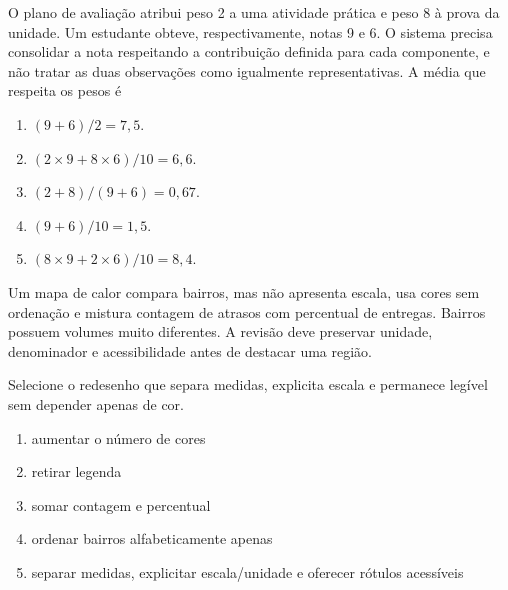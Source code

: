\documentclass[12pt,a4paper]{article}
\begin{document}
\TextoBase O plano de avaliação atribui peso 2 a uma atividade prática e peso 8 à prova da unidade. Um estudante obteve, respectivamente, notas 9 e 6. O sistema precisa consolidar a nota respeitando a contribuição definida para cada componente, e não tratar as duas observações como igualmente representativas.
\FonteDidatica
\Comando A média que respeita os pesos é
\begin{enumerate}[label=\Alph*)]
  \item $(9+6)/2=7{,}5$.
  \item $(2\times9+8\times6)/10=6{,}6$.
  \item $(2+8)/(9+6)=0{,}67$.
  \item $(9+6)/10=1{,}5$.
  \item $(8\times9+2\times6)/10=8{,}4$.
\end{enumerate}


\TextoBase

Um mapa de calor compara bairros, mas não apresenta escala, usa cores sem ordenação e mistura contagem de atrasos com percentual de entregas. Bairros possuem volumes muito diferentes. A revisão deve preservar unidade, denominador e acessibilidade antes de destacar uma região.

\FonteDidatica

\Comando Selecione o redesenho que separa medidas, explicita escala e permanece legível sem depender apenas de cor.

\begin{enumerate}[label=\Alph*)]
  \item aumentar o número de cores
  \item retirar legenda
  \item somar contagem e percentual
  \item ordenar bairros alfabeticamente apenas
  \item separar medidas, explicitar escala/unidade e oferecer rótulos acessíveis
\end{enumerate}
\end{document}
